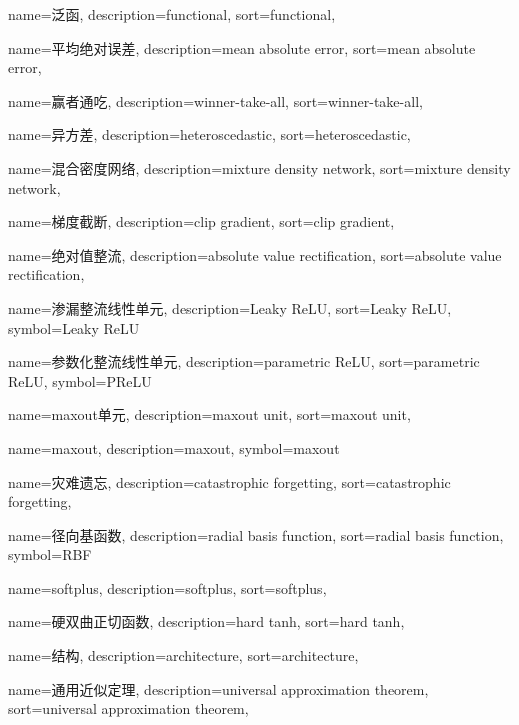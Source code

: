 {
  name=泛函,
  description={functional},
  sort={functional},
}

{
  name=平均绝对误差,
  description={mean absolute error},
  sort={mean absolute error},
}

{
  name=赢者通吃,
  description={winner-take-all},
  sort={winner-take-all},
}

{
  name=异方差,
  description={heteroscedastic},
  sort={heteroscedastic},
}

{
  name=混合密度网络,
  description={mixture density network},
  sort={mixture density network},
}

{
  name=梯度截断,
  description={clip gradient},
  sort={clip gradient},
}

{
  name=绝对值整流,
  description={absolute value rectification},
  sort={absolute value rectification},
}

{
  name=渗漏整流线性单元,
  description={Leaky ReLU},
  sort={Leaky ReLU},
  symbol={Leaky ReLU}
}

{
  name=参数化整流线性单元,
  description={parametric ReLU},
  sort={parametric ReLU},
  symbol={PReLU}
}

{
  name=maxout单元,
  description={maxout unit},
  sort={maxout unit},
}

{
  name=maxout,
  description={maxout},
  symbol={maxout}
}

{
  name=灾难遗忘,
  description={catastrophic forgetting},
  sort={catastrophic forgetting},
}

{
  name=径向基函数,
  description={radial basis function},
  sort={radial basis function},
  symbol={RBF}
}

{
  name=softplus,
  description={softplus},
  sort={softplus},
}

{
  name=硬双曲正切函数,
  description={hard tanh},
  sort={hard tanh},
}

{
  name=结构,
  description={architecture},
  sort={architecture},
}

{
  name=通用近似定理, %
  description={universal approximation theorem},
  sort={universal approximation theorem},
}

